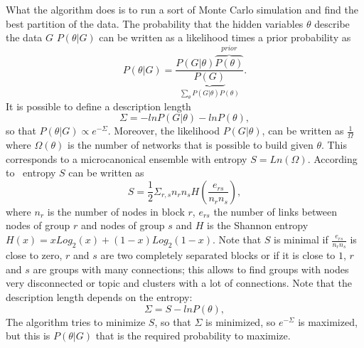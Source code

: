 What the algorithm does is to run a sort of Monte Carlo simulation and find the best partition of the data.
The probability that the hidden variables $\theta$ describe the data $G$ $P(\theta | G)$ can be written as a likelihood times a prior probability as
\[P(\theta|G)=\frac{P(G|\theta)\overbrace{P(\theta)}^{prior}}{\underbrace{P(G)}_{\sum_{\theta}P(G|\theta)P(\theta)}}.\]
It is possible to define a description length
\[
\Sigma=-lnP(G|\theta)-lnP(\theta),
\]
so that $P(\theta | G)\propto e^{-\Sigma}$.
Moreover, the likelihood $P(G | \theta)$, can be written as $\frac{1}{\Omega}$ where $\Omega(\theta)$ is the number of networks that is possible to build given $\theta$. This corresponds to a microcanonical ensemble with entropy $S=Ln\left(\Omega\right)$. According to~\cite{peixoto2017nonparametric} entropy $S$ can be written as
\[
S=\frac{1}{2}\Sigma_{r,s} n_r n_s H\left(\frac{e_{rs}}{n_rn_s}\right),
\]
where $n_r$ is the number of nodes in block $r$, $e_{rs}$ the number of links between nodes of group $r$ and nodes of group $s$ and $H$ is the Shannon entropy $H(x)=xLog_2(x)+(1-x)Log_2(1-x)$. Note that $S$ is minimal if $\frac{e_{rs}}{n_rn_s}$ is close to zero, $r$ and $s$ are two completely separated blocks or if it is close to $1$, $r$ and $s$ are groups with many connections; this allows to find groups with nodes very disconnected or topic and clusters with a lot of connections. Note that the description length depends on the entropy:
\[
\Sigma=S-lnP(\theta),
\]
The algorithm tries to minimize $S$, so that $\Sigma$ is minimized, so $e^{-\Sigma}$ is maximized, but this is $P(\theta | G)$ that is the required probability to maximize.

